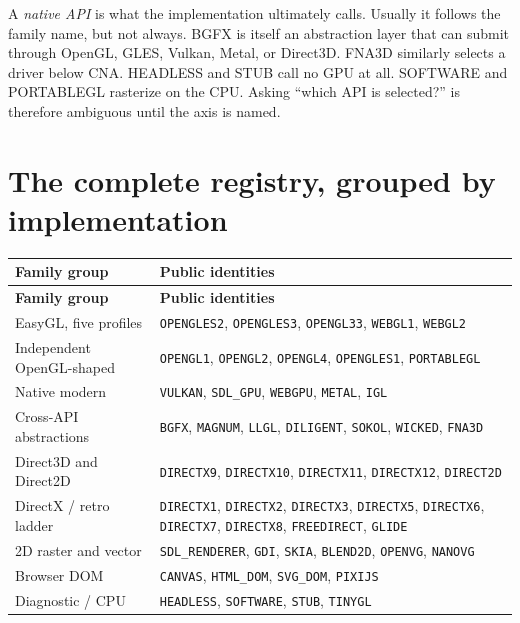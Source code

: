 A \emph{native API} is what the implementation ultimately calls. Usually it follows the family
name, but not always. BGFX is itself an abstraction layer that can submit through OpenGL, GLES,
Vulkan, Metal, or Direct3D. FNA3D similarly selects a driver below CNA. HEADLESS and STUB call no
GPU at all. SOFTWARE and PORTABLEGL rasterize on the CPU. Asking ``which API is selected?''
is therefore ambiguous until the axis is named.

\section{The complete registry, grouped by implementation}

\begingroup
\small
\setlength{\tabcolsep}{4pt}
\renewcommand{\arraystretch}{1.12}
\begin{longtable}{@{}p{}p{}@{}}
\toprule
\textbf{Family group} & \textbf{Public identities} \\
\midrule
\endfirsthead
\toprule
\textbf{Family group} & \textbf{Public identities} \\
\midrule
\endhead
EasyGL, five profiles
  & \texttt{OPENGLES2}, \texttt{OPENGLES3}, \texttt{OPENGL33},
    \texttt{WEBGL1}, \texttt{WEBGL2} \\
Independent OpenGL-shaped
  & \texttt{OPENGL1}, \texttt{OPENGL2}, \texttt{OPENGL4},
    \texttt{OPENGLES1}, \texttt{PORTABLEGL} \\
Native modern
  & \texttt{VULKAN}, \texttt{SDL\_GPU}, \texttt{WEBGPU}, \texttt{METAL}, \texttt{IGL} \\
Cross-API abstractions
  & \texttt{BGFX}, \texttt{MAGNUM}, \texttt{LLGL}, \texttt{DILIGENT},
    \texttt{SOKOL}, \texttt{WICKED}, \texttt{FNA3D} \\
Direct3D and Direct2D
  & \texttt{DIRECTX9}, \texttt{DIRECTX10}, \texttt{DIRECTX11},
    \texttt{DIRECTX12}, \texttt{DIRECT2D} \\
DirectX / retro ladder
  & \texttt{DIRECTX1}, \texttt{DIRECTX2}, \texttt{DIRECTX3},
    \texttt{DIRECTX5}, \texttt{DIRECTX6}, \texttt{DIRECTX7},
    \texttt{DIRECTX8}, \texttt{FREEDIRECT}, \texttt{GLIDE} \\
2D raster and vector
  & \texttt{SDL\_RENDERER}, \texttt{GDI}, \texttt{SKIA},
    \texttt{BLEND2D}, \texttt{OPENVG}, \texttt{NANOVG} \\
Browser DOM
  & \texttt{CANVAS}, \texttt{HTML\_DOM}, \texttt{SVG\_DOM}, \texttt{PIXIJS} \\
Diagnostic / CPU
  & \texttt{HEADLESS}, \texttt{SOFTWARE}, \texttt{STUB}, \texttt{TINYGL} \\
\bottomrule
\end{longtable}
\endgroup

